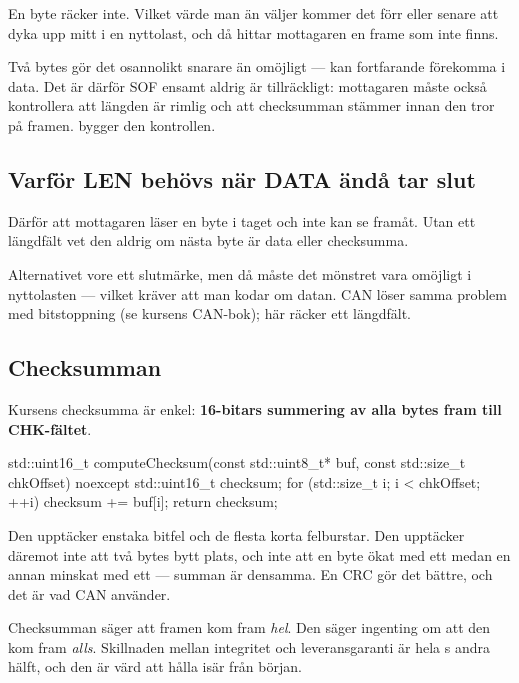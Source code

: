 En byte räcker inte. Vilket värde man än väljer kommer det förr eller senare att dyka upp mitt i
en nyttolast, och då hittar mottagaren en frame som inte finns.

Två bytes gör det osannolikt snarare än omöjligt ---  kan fortfarande förekomma i
data. Det är därför SOF ensamt aldrig är tillräckligt: mottagaren måste också kontrollera att
längden är rimlig och att checksumman stämmer innan den tror på framen. 
bygger den kontrollen.

\subsection{Varför LEN behövs när DATA ändå tar slut}

Därför att mottagaren läser en byte i taget och inte kan se framåt. Utan ett längdfält vet den
aldrig om nästa byte är data eller checksumma.

Alternativet vore ett slutmärke, men då måste det mönstret vara omöjligt i nyttolasten --- vilket
kräver att man kodar om datan. CAN löser samma problem med bitstoppning (se kursens CAN-bok);
här räcker ett längdfält.

\subsection{Checksumman}

Kursens checksumma är enkel: \textbf{16-bitars summering av alla bytes fram till CHK-fältet}.

\begin{cppcode}
std::uint16_t computeChecksum(const std::uint8_t* buf, const std::size_t chkOffset) noexcept
{
    std::uint16_t checksum{};
    for (std::size_t i{}; i < chkOffset; ++i)
    {
        checksum += buf[i];
    }
    return checksum;
}
\end{cppcode}

Den upptäcker enstaka bitfel och de flesta korta felburstar. Den upptäcker däremot inte att två
bytes bytt plats, och inte att en byte ökat med ett medan en annan minskat med ett --- summan är
densamma. En CRC gör det bättre, och det är vad CAN använder.

\begin{aside}
\note Checksumman säger att framen kom fram \emph{hel}. Den säger ingenting om att den kom fram
\emph{alls}. Skillnaden mellan integritet och leveransgaranti är hela s andra
hälft, och den är värd att hålla isär från början.
\end{aside}

